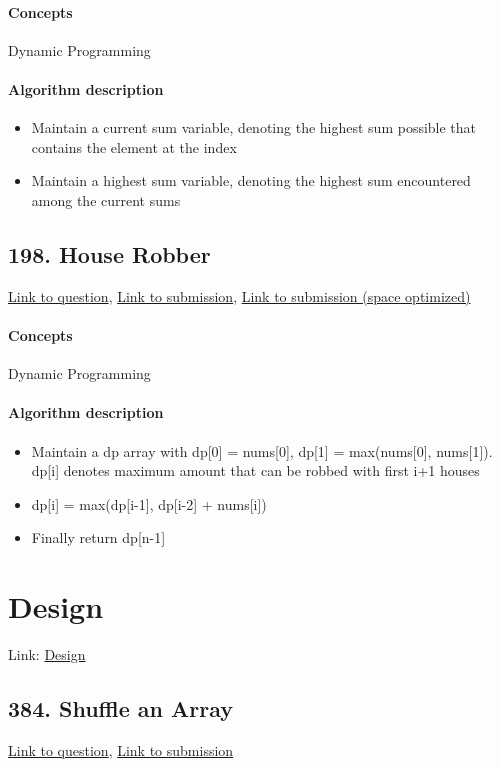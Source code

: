\documentclass[11pt]{book}
\begin{document}
\paragraph{Concepts}
Dynamic Programming
\paragraph{Algorithm description}
\begin{itemize}
    \item Maintain a current sum variable, denoting the highest sum possible that contains the element at the index
    \item Maintain a highest sum variable, denoting the highest sum encountered among the current sums
\end{itemize}

\subsection{198. House Robber}
\href{https://leetcode.com/problems/house-robber/}{Link to question},
\href{https://leetcode.com/submissions/detail/335418653/}{Link to submission},
\href{https://leetcode.com/submissions/detail/335415699/}{Link to submission (space optimized)}
\paragraph{Concepts}
Dynamic Programming
\paragraph{Algorithm description}
\begin{itemize}
    \item Maintain a dp array with dp[0] = nums[0], dp[1] = max(nums[0], nums[1]).
    dp[i] denotes maximum amount that can be robbed with first i+1 houses
    \item dp[i] = max(dp[i-1], dp[i-2] + nums[i])
    \item Finally return dp[n-1]
\end{itemize}

\newpage

\section{Design}
Link: \href{https://leetcode.com/explore/featured/card/top-interview-questions-easy/98/design/}{Design}

\subsection{384. Shuffle an Array}
\href{https://leetcode.com/problems/shuffle-an-array/}{Link to question},
\href{https://leetcode.com/submissions/detail/335673163/}{Link to submission}
\end{document}
